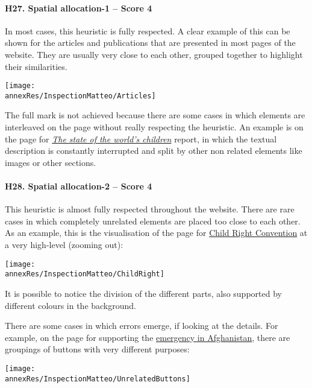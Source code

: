 \paragraph*{H27. Spatial allocation-1 – Score 4}
In most cases, this heuristic is fully respected. A clear example of this can be shown for the articles and publications that are presented in most pages of the website. They are usually very close to each other, grouped together to highlight their similarities. 

\begin{center}
	\texttt{[image: \\annexRes/InspectionMatteo/Articles]}
\end{center}

The full mark is not achieved because there are some cases in which elements are interleaved on the page without really respecting the heuristic. An example is on the page for \href{https://www.unicef.org/reports/state-worlds-children-2023#SOWC}{\textit{The state of the world's children}} report, in which the textual description is constantly interrupted and split by other non related elements like images or other sections.


\paragraph*{H28. Spatial allocation-2  – Score 4}
This heuristic is almost fully respected throughout the website. There are rare cases in which completely unrelated elements are placed too close to each other. 
As an example, this is the visualisation of the page for \href{https://www.unicef.org/child-rights-convention}{Child Right Convention} at a very high-level (zooming out):

\begin{center}
	\texttt{[image: \\annexRes/InspectionMatteo/ChildRight]}
\end{center}

It is possible to notice the division of the different parts, also supported by different colours in the background.

There are some cases in which errors emerge, if looking at the details. For example, on the page for supporting the \href{https://www.unicef.org/emergencies/delivering-support-afghanistans-children}{emergency in Afghanistan}, there are groupings of buttons with very different purposes:

\begin{center}
	\texttt{[image: \\annexRes/InspectionMatteo/UnrelatedButtons]}
\end{center}



